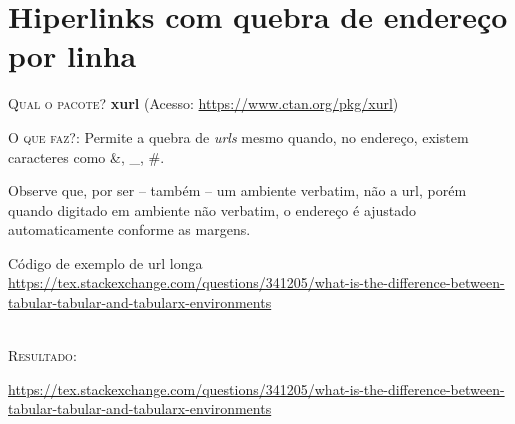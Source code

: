 \chapter{Hiperlinks com quebra de endereço por linha}

\textsc{Qual o pacote?} \textbf{xurl} (Acesso: \url{https://www.ctan.org/pkg/xurl})

\textsc{O que faz?}: Permite a quebra de \textit{urls} mesmo quando, no endereço, existem caracteres como \&, \_, \#.

Observe que, por ser -- também -- um ambiente verbatim, não  a url, porém quando digitado em ambiente não verbatim, o endereço é ajustado automaticamente conforme as margens.
\ \\

\begin{codex}{Código de exemplo de url longa}
\url{https://tex.stackexchange.com/questions/341205/what-is-the-difference-between-tabular-tabular-and-tabularx-environments}
\end{codex}
\ \\

\textsc{Resultado:}

\url{https://tex.stackexchange.com/questions/341205/what-is-the-difference-between-tabular-tabular-and-tabularx-environments}
